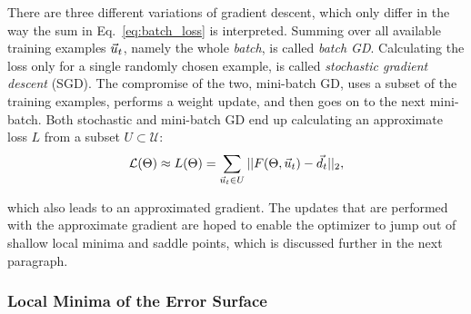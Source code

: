 There are three different variations of gradient descent, which only differ in
the way the sum in Eq.~\ref{eq:batch_loss} is interpreted.  Summing over all
available training examples $\vec{u}_t$, namely the whole \emph{batch}, is called
{\em batch GD}. Calculating the loss only for a single randomly chosen example,
is called \emph{stochastic gradient descent} (SGD). The compromise of the two,
mini-batch GD, uses a subset of the training examples, performs a weight
update, and then goes on to the next mini-batch.  Both stochastic and
mini-batch GD end up calculating an approximate loss $L$ from a subset $U
\subset \mathcal{U}$:
\begin{equation}
  \mathcal{L}(\Theta) \approx L(\Theta) = 
    \sum_{\vec{u}_t \in U} ||F(\Theta, \vec{u}_t) - \vec{d}_t||_2,
\end{equation}

which also leads to an approximated gradient. The updates that are performed
with the approximate gradient are hoped to enable the optimizer to jump out of
shallow local minima and saddle points, which is discussed further in the next
paragraph.

\subsubsection{Local Minima of the Error Surface}%
\label{ssub:local_minima_of_the_error_surface}

